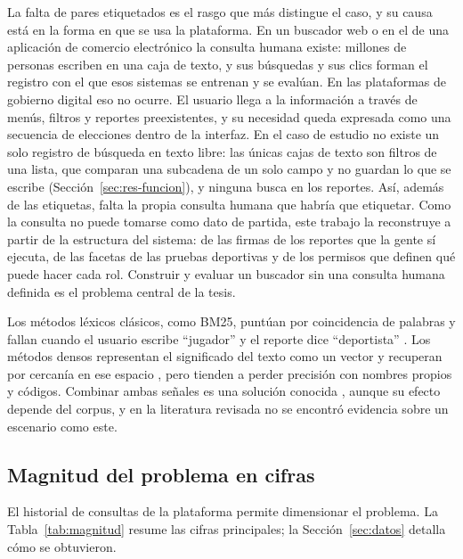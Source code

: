 \documentclass[11pt,letterpaper]{article}
\numberwithin{equation}{section}
\begin{document}
La falta de pares etiquetados es el rasgo que más distingue el caso, y su causa está en la forma en que se usa la plataforma. En un buscador web o en el de una aplicación de comercio electrónico la consulta humana existe: millones de personas escriben en una caja de texto, y sus búsquedas y sus clics forman el registro con el que esos sistemas se entrenan y se evalúan. En las plataformas de gobierno digital eso no ocurre. El usuario llega a la información a través de menús, filtros y reportes preexistentes, y su necesidad queda expresada como una secuencia de elecciones dentro de la interfaz. En el caso de estudio no existe un solo registro de búsqueda en texto libre: las únicas cajas de texto son filtros de una lista, que comparan una subcadena de un solo campo y no guardan lo que se escribe (Sección~\ref{sec:res-funcion}), y ninguna busca en los reportes. Así, además de las etiquetas, falta la propia consulta humana que habría que etiquetar. Como la consulta no puede tomarse como dato de partida, este trabajo la reconstruye a partir de la estructura del sistema: de las firmas de los reportes que la gente sí ejecuta, de las facetas de las pruebas deportivas y de los permisos que definen qué puede hacer cada rol. Construir y evaluar un buscador sin una consulta humana definida es el problema central de la tesis.

Los métodos léxicos clásicos, como BM25, puntúan por coincidencia de palabras y fallan cuando el usuario escribe ``jugador'' y el reporte dice ``deportista'' \cite{robertson2009bm25,karpukhin2020dpr}. Los métodos densos representan el significado del texto como un vector y recuperan por cercanía en ese espacio \cite{karpukhin2020dpr,reimers2019sbert}, pero tienden a perder precisión con nombres propios y códigos. Combinar ambas señales es una solución conocida \cite{chen2024m3,luan2021sparse}, aunque su efecto depende del corpus, y en la literatura revisada no se encontró evidencia sobre un escenario como este.

\subsection{Magnitud del problema en cifras}
\label{sec:magnitud}
El historial de consultas de la plataforma permite dimensionar el problema. La Tabla~\ref{tab:magnitud} resume las cifras principales; la Sección~\ref{sec:datos} detalla cómo se obtuvieron.
\end{document}
